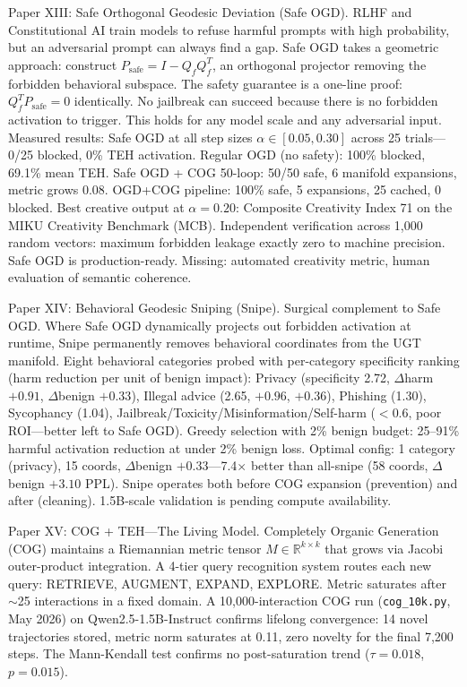 \documentclass[11pt]{article}
\begin{document}
Paper XIII: Safe Orthogonal Geodesic Deviation (Safe OGD). RLHF and Constitutional AI train models to refuse harmful prompts with high probability, but an adversarial prompt can always find a gap. Safe OGD takes a geometric approach: construct $P_{\mathrm{safe}} = I - Q_f Q_f^T$, an orthogonal projector removing the forbidden behavioral subspace. The safety guarantee is a one-line proof: $Q_f^T P_{\mathrm{safe}} = 0$ identically. No jailbreak can succeed because there is no forbidden activation to trigger. This holds for any model scale and any adversarial input. Measured results: Safe OGD at all step sizes $\alpha \in [0.05, 0.30]$ across 25 trials---0/25 blocked, 0\% TEH activation. Regular OGD (no safety): 100\% blocked, 69.1\% mean TEH. Safe OGD + COG 50-loop: 50/50 safe, 6 manifold expansions, metric grows 0.08. OGD+COG pipeline: 100\% safe, 5 expansions, 25 cached, 0 blocked. Best creative output at $\alpha = 0.20$: Composite Creativity Index 71 on the MIKU Creativity Benchmark (MCB). Independent verification across 1,000 random vectors: maximum forbidden leakage exactly zero to machine precision. Safe OGD is production-ready. Missing: automated creativity metric, human evaluation of semantic coherence.

Paper XIV: Behavioral Geodesic Sniping (Snipe). Surgical complement to Safe OGD. Where Safe OGD dynamically projects out forbidden activation at runtime, Snipe permanently removes behavioral coordinates from the UGT manifold. Eight behavioral categories probed with per-category specificity ranking (harm reduction per unit of benign impact): Privacy (specificity 2.72, $\Delta$harm $+0.91$, $\Delta$benign $+0.33$), Illegal advice (2.65, $+0.96$, $+0.36$), Phishing (1.30), Sycophancy (1.04), Jailbreak/Toxicity/Misinformation/Self-harm ($<0.6$, poor ROI---better left to Safe OGD). Greedy selection with 2\% benign budget: 25--91\% harmful activation reduction at under 2\% benign loss. Optimal config: 1 category (privacy), 15 coords, $\Delta$benign $+0.33$---7.4$\times$ better than all-snipe (58 coords, $\Delta$benign $+3.10$ PPL). Snipe operates both before COG expansion (prevention) and after (cleaning). 1.5B-scale validation is pending compute availability.

Paper XV: COG + TEH---The Living Model. Completely Organic Generation (COG) maintains a Riemannian metric tensor $M \in \mathbb{R}^{k \times k}$ that grows via Jacobi outer-product integration. A 4-tier query recognition system routes each new query: RETRIEVE, AUGMENT, EXPAND, EXPLORE. Metric saturates after $\sim$25 interactions in a fixed domain. A 10,000-interaction COG run (\texttt{cog\_10k.py}, May 2026) on Qwen2.5-1.5B-Instruct confirms lifelong convergence: 14 novel trajectories stored, metric norm saturates at 0.11, zero novelty for the final 7,200 steps. The Mann-Kendall test confirms no post-saturation trend ($\tau = 0.018$, $p = 0.015$).
\end{document}
